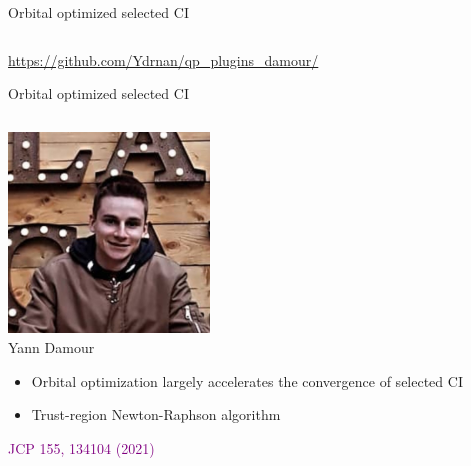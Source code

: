 \documentclass[aspectratio=169,9pt]{beamer}
\newcommand{\pub}[1]{{\small \textcolor{purple}{#1}}}
\begin{document}
\begin{frame}{Orbital optimized selected CI}
\begin{columns}
        \end{columns}

                        \bigskip
                        \centering
	\url{https://github.com/Ydrnan/qp_plugins_damour/}

\end{frame}

\begin{frame}{Orbital optimized selected CI}

\begin{columns}

\begin{column}{0.5\textwidth}

\centering
\includegraphics[width=0.4\textwidth]{fig/Yann2.jpg}
\\
Yann Damour
\\

\begin{itemize}
    \item Orbital optimization largely accelerates the convergence of selected CI
                        \bigskip
    \item Trust-region Newton-Raphson algorithm
                        \bigskip
\end{itemize}
            \bigskip
                        \centering
            \pub{JCP 155, 134104 (2021)}
\end{column}


\end{columns}
\end{frame}
\end{document}
